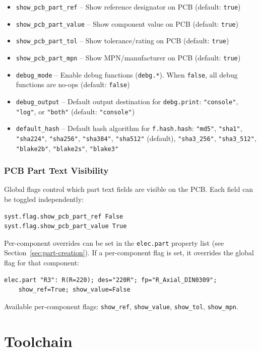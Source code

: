 \begin{itemize}
\item \texttt{show\_pcb\_part\_ref} -- Show reference designator on PCB (default: \texttt{true})
\item \texttt{show\_pcb\_part\_value} -- Show component value on PCB (default: \texttt{true})
\item \texttt{show\_pcb\_part\_tol} -- Show tolerance/rating on PCB (default: \texttt{true})
\item \texttt{show\_pcb\_part\_mpn} -- Show MPN/manufacturer on PCB (default: \texttt{true})
\item \texttt{debug\_mode} -- Enable debug functions (\texttt{debg.*}). When \texttt{false}, all debug functions are no-ops (default: \texttt{false})
\item \texttt{debug\_output} -- Default output destination for \texttt{debg.print}: \texttt{"console"}, \texttt{"log"}, or \texttt{"both"} (default: \texttt{"console"})
\item \texttt{default\_hash} -- Default hash algorithm for \texttt{f.hash.hash}: \texttt{"md5"}, \texttt{"sha1"}, \texttt{"sha224"}, \texttt{"sha256"}, \texttt{"sha384"}, \texttt{"sha512"} (default), \texttt{"sha3\_256"}, \texttt{"sha3\_512"}, \texttt{"blake2b"}, \texttt{"blake2s"}, \texttt{"blake3"}
\end{itemize}

\section{PCB Part Text Visibility}
Global flags control which part text fields are visible on the PCB. Each field can be toggled independently:
\begin{verbatim}
syst.flag.show_pcb_part_ref False
syst.flag.show_pcb_part_value True
\end{verbatim}

Per-component overrides can be set in the \texttt{elec.part} property list (see Section~\ref{sec:part-creation}). If a per-component flag is set, it overrides the global flag for that component:
\begin{verbatim}
elec.part "R3": R(R=220); des="220R"; fp="R_Axial_DIN0309";
    show_ref=True; show_value=False
\end{verbatim}
Available per-component flags: \texttt{show\_ref}, \texttt{show\_value}, \texttt{show\_tol}, \texttt{show\_mpn}.


\part{Toolchain}
